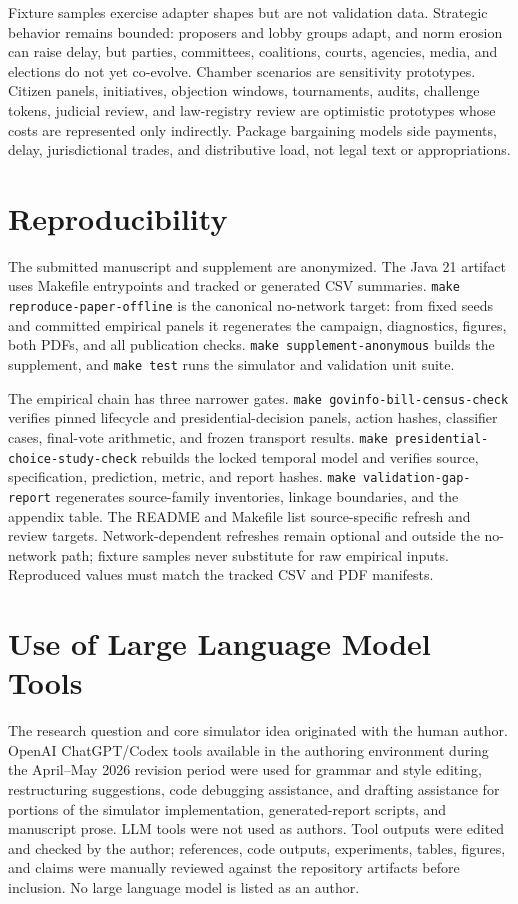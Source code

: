 \documentclass[manuscript]{acmart}
\begin{document}
Fixture samples exercise adapter shapes but are not validation data.
Strategic behavior remains bounded: proposers and lobby groups adapt, and norm erosion can raise delay, but parties, committees, coalitions, courts, agencies, media, and elections do not yet co-evolve.
Chamber scenarios are sensitivity prototypes.
Citizen panels, initiatives, objection windows, tournaments, audits, challenge tokens, judicial review, and law-registry review are optimistic prototypes whose costs are represented only indirectly.
Package bargaining models side payments, delay, jurisdictional trades, and distributive load, not legal text or appropriations.

\section{Reproducibility}

The submitted manuscript and supplement are anonymized. The Java 21 artifact uses Makefile entrypoints and tracked or generated CSV summaries. \texttt{make reproduce-paper-offline} is the canonical no-network target: from fixed seeds and committed empirical panels it regenerates the campaign, diagnostics, figures, both PDFs, and all publication checks. \texttt{make supplement-anonymous} builds the supplement, and \texttt{make test} runs the simulator and validation unit suite.

The empirical chain has three narrower gates. \texttt{make govinfo-bill-census-check} verifies pinned lifecycle and presidential-decision panels, action hashes, classifier cases, final-vote arithmetic, and frozen transport results. \texttt{make presidential-choice-study-check} rebuilds the locked temporal model and verifies source, specification, prediction, metric, and report hashes. \texttt{make validation-gap-report} regenerates source-family inventories, linkage boundaries, and the appendix table. The README and Makefile list source-specific refresh and review targets. Network-dependent refreshes remain optional and outside the no-network path; fixture samples never substitute for raw empirical inputs. Reproduced values must match the tracked CSV and PDF manifests.

\section*{Use of Large Language Model Tools}

The research question and core simulator idea originated with the human author. OpenAI ChatGPT/Codex tools available in the authoring environment during the April--May 2026 revision period were used for grammar and style editing, restructuring suggestions, code debugging assistance, and drafting assistance for portions of the simulator implementation, generated-report scripts, and manuscript prose. LLM tools were not used as authors. Tool outputs were edited and checked by the author; references, code outputs, experiments, tables, figures, and claims were manually reviewed against the repository artifacts before inclusion. No large language model is listed as an author.
\end{document}
